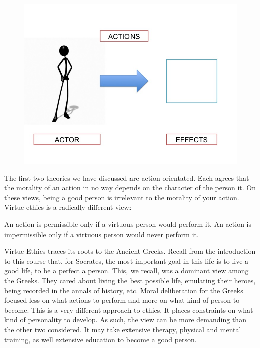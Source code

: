 \documentclass[9pt]{article}
\begin{document}
\begin{figure}[htbp]
\centering
\includegraphics{Slide1.jpg}

\end{figure}

The first two theories we have discussed are action orientated. Each
agrees that the morality of an action in no way depends on the character
of the person it. On these views, being a good person is irrelevant to
the morality of your action. Virtue ethics is a radically different
view:

\begin{description}
\itemsep1pt\parskip0pt
\item[Virtue Ethics:]
An action is permissible only if a virtuous person would perform it. An
action is impermissible only if a virtuous person would never perform
it.
\end{description}

Virtue Ethics traces its roots to the Ancient Greeks. Recall from the
introduction to this course that, for Socrates, the most important goal
in this life is to live a good life, to be a perfect a person. This, we
recall, was a dominant view among the Greeks. They cared about living
the best possible life, emulating their heroes, being recorded in the
annals of history, etc. Moral deliberation for the Greeks focused less
on what actions to perform and more on what kind of person to become.
This is a very different approach to ethics. It places constraints on
what kind of personality to develop. As such, the view can be more
demanding than the other two considered. It may take extensive therapy,
physical and mental training, as well extensive education to become a
good person.
\end{document}
